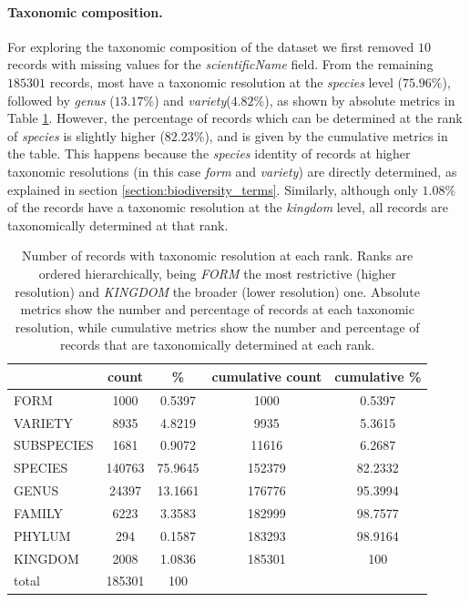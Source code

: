 \paragraph*{Taxonomic composition.}
% 
For exploring the taxonomic composition of the dataset we first removed $10$ records with missing values for the \textit{scientificName} field.
From the remaining $185301$ records, most have a taxonomic resolution at the \textit{species} level ($75.96\%$), followed by \textit{genus} ($13.17\%$) and \textit{variety}($4.82\%$), as shown by absolute metrics in Table \ref{table:dset_taxonomicres_counts}. 
However, the percentage of records which can be determined at the rank of \textit{species} is slightly higher ($82.23\%$), and is given by the cumulative metrics in the table. 
This happens because the \textit{species} identity of records at higher taxonomic resolutions (in this case \textit{form} and \textit{variety}) are directly determined, as explained in section \ref{section:biodiversity_terms}.
Similarly, although only $1.08\%$ of the records have a taxonomic resolution at the \textit{kingdom} level, all records are taxonomically determined at that rank.

\begin{table}[H]
  \caption{Number of records with taxonomic resolution at each rank. Ranks are ordered hierarchically, being \textit{FORM} the most restrictive (higher resolution) and \textit{KINGDOM} the broader (lower resolution) one. Absolute metrics show the number and percentage of records at each taxonomic resolution, while cumulative metrics show the number and percentage of records that are taxonomically determined at each rank.}
  \begin{center}
  \begin{tabular}{l c c c c}
       & count & \% & cumulative count & cumulative \% \\
      \hline
      FORM & 1000 & 0.5397 & 1000 & 0.5397\\
      VARIETY & 8935 & 4.8219 & 9935 & 5.3615\\
      SUBSPECIES & 1681 & 0.9072 & 11616 & 6.2687\\
      SPECIES & 140763 & 75.9645 & 152379 & 82.2332\\
      GENUS & 24397 & 13.1661 & 176776 & 95.3994\\
      FAMILY & 6223 & 3.3583 & 182999 & 98.7577\\
      PHYLUM & 294 & 0.1587 & 183293 & 98.9164\\
      KINGDOM & 2008 & 1.0836 & 185301 & 100\\
      \hline
      total & 185301 & 100 & &
  \end{tabular}
  \end{center}
  \label{table:dset_taxonomicres_counts}
\end{table}


